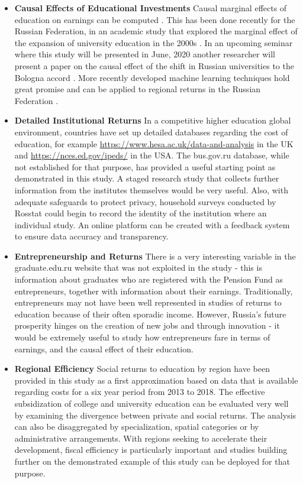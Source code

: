 \documentclass[alpha-refs]{wiley-article-04t}
\begin{document}
\begin{itemize}
	
\item \textbf{Causal Effects of Educational Investments} Causal marginal 
effects of education on earnings can be computed
\parencite{carneiro2011,heckman2018}. This has been done recently for the  
Russian Federation, in an academic study that explored the marginal effect 
of the expansion of university education in the 2000s 
\parencite{belskaya2020}. In an upcoming 
seminar where this study will be presented in June, 2020 another researcher 
will present a paper on the causal effect of the shift in Russian 
universities to the Bologna accord \parencite{avdeev2020}. More recently 
developed machine learning techniques hold great promise and can be applied 
to regional returns in the Russian Federation \parencite{kim2019}. 
	
\item \textbf{Detailed Institutional Returns} In a competitive higher 
education global environment, countries have set up detailed databases 
regarding the cost of education, for example 
\url{https://www.hesa.ac.uk/data-and-analysis} in the UK and 
\url{https://nces.ed.gov/ipeds/} in the USA. The bus.gov.ru database, while 
not established for that purpose, has provided a useful starting point as 
demonstrated in this study. A staged research study that collects further 
information from the institutes themselves would be very useful. Also, with 
adequate safeguards to protect privacy, household surveys conducted by 
Rosstat could begin to record the identity of the institution where an 
individual study. An online platform can be created with a feedback system 
to ensure data accuracy and transparency. 

\item \textbf{Entrepreneurship and Returns} There is a very interesting 
variable in the graduate.edu.ru website that was not exploited in the study 
- this is information about graduates who are registered with the Pension 
Fund as entrepreneurs, together with information about their earnings. 
Traditionally, entrepreneurs may not have been well represented in studies 
of returns to education because of their often sporadic income. However, 
Russia's future prosperity hinges on the creation of new jobs and through 
innovation - it would be extremely useful to study how entrepreneurs fare 
in terms of earnings, and the causal effect of their education.

\item \textbf{Regional Efficiency} Social returns to education by region 
have been provided in this study as a first approximation based on data 
that is available regarding costs for a six year period from 2013 to 2018. 
The effective subsidization of college and university education can be 
evaluated very well by examining the divergence between private and social 
returns. The analysis can also be disaggregated by specialization, spatial 
categories or by administrative arrangements. With regions seeking to 
accelerate their development, fiscal efficiency is particularly important 
and studies building further on the demonstrated example of this study can 
be deployed for that purpose. 


\end{itemize}
\end{document}
